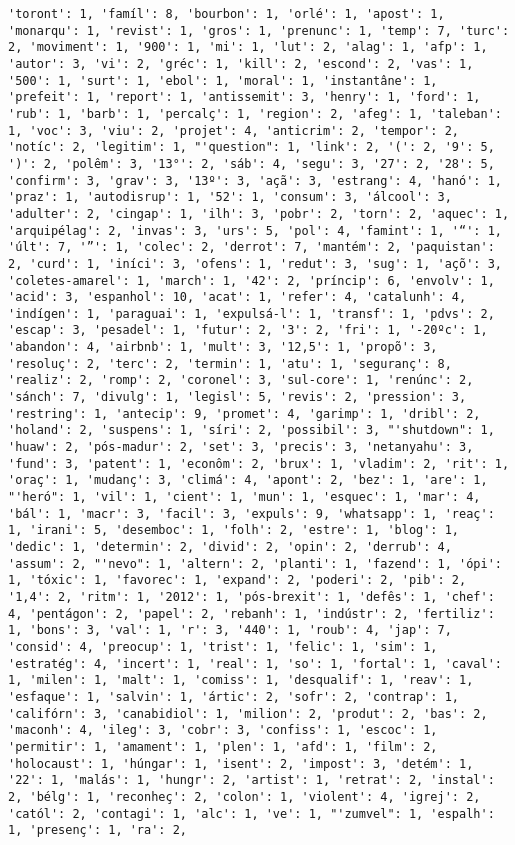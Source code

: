 \documentclass[11pt]{article}
\begin{document}
\begin{Verbatim}[commandchars=\\\{\}]
'toront': 1, 'famíl': 8, 'bourbon': 1, 'orlé': 1, 'apost': 1, 'monarqu': 1, 'revist': 1, 'gros': 1, 'prenunc': 1, 'temp': 7, 'turc': 2, 'moviment': 1, '900': 1, 'mi': 1, 'lut': 2, 'alag': 1, 'afp': 1, 'autor': 3, 'vi': 2, 'gréc': 1, 'kill': 2, 'escond': 2, 'vas': 1, '500': 1, 'surt': 1, 'ebol': 1, 'moral': 1, 'instantâne': 1, 'prefeit': 1, 'report': 1, 'antissemit': 3, 'henry': 1, 'ford': 1, 'rub': 1, 'barb': 1, 'percalç': 1, 'region': 2, 'afeg': 1, 'taleban': 1, 'voc': 3, 'viu': 2, 'projet': 4, 'anticrim': 2, 'tempor': 2, 'notíc': 2, 'legitim': 1, "'question": 1, 'link': 2, '(': 2, '9': 5, ')': 2, 'polêm': 3, '13°': 2, 'sáb': 4, 'segu': 3, '27': 2, '28': 5, 'confirm': 3, 'grav': 3, '13º': 3, 'açã': 3, 'estrang': 4, 'hanó': 1, 'praz': 1, 'autodisrup': 1, '52': 1, 'consum': 3, 'álcool': 3, 'adulter': 2, 'cingap': 1, 'ilh': 3, 'pobr': 2, 'torn': 2, 'aquec': 1, 'arquipélag': 2, 'invas': 3, 'urs': 5, 'pol': 4, 'famint': 1, '“': 1, 'últ': 7, '”': 1, 'colec': 2, 'derrot': 7, 'mantém': 2, 'paquistan': 2, 'curd': 1, 'iníci': 3, 'ofens': 1, 'redut': 3, 'sug': 1, 'açõ': 3, 'coletes-amarel': 1, 'march': 1, '42': 2, 'príncip': 6, 'envolv': 1, 'acid': 3, 'espanhol': 10, 'acat': 1, 'refer': 4, 'catalunh': 4, 'indígen': 1, 'paraguai': 1, 'expulsá-l': 1, 'transf': 1, 'pdvs': 2, 'escap': 3, 'pesadel': 1, 'futur': 2, '3': 2, 'fri': 1, '-20ºc': 1, 'abandon': 4, 'airbnb': 1, 'mult': 3, '12,5': 1, 'propõ': 3, 'resoluç': 2, 'terc': 2, 'termin': 1, 'atu': 1, 'seguranç': 8, 'realiz': 2, 'romp': 2, 'coronel': 3, 'sul-core': 1, 'renúnc': 2, 'sánch': 7, 'divulg': 1, 'legisl': 5, 'revis': 2, 'pression': 3, 'restring': 1, 'antecip': 9, 'promet': 4, 'garimp': 1, 'dribl': 2, 'holand': 2, 'suspens': 1, 'síri': 2, 'possibil': 3, "'shutdown": 1, 'huaw': 2, 'pós-madur': 2, 'set': 3, 'precis': 3, 'netanyahu': 3, 'fund': 3, 'patent': 1, 'econôm': 2, 'brux': 1, 'vladim': 2, 'rit': 1, 'oraç': 1, 'mudanç': 3, 'climá': 4, 'apont': 2, 'bez': 1, 'are': 1, "'heró": 1, 'vil': 1, 'cient': 1, 'mun': 1, 'esquec': 1, 'mar': 4, 'bál': 1, 'macr': 3, 'facil': 3, 'expuls': 9, 'whatsapp': 1, 'reaç': 1, 'irani': 5, 'desemboc': 1, 'folh': 2, 'estre': 1, 'blog': 1, 'dedic': 1, 'determin': 2, 'divid': 2, 'opin': 2, 'derrub': 4, 'assum': 2, "'nevo": 1, 'altern': 2, 'planti': 1, 'fazend': 1, 'ópi': 1, 'tóxic': 1, 'favorec': 1, 'expand': 2, 'poderi': 2, 'pib': 2, '1,4': 2, 'ritm': 1, '2012': 1, 'pós-brexit': 1, 'defês': 1, 'chef': 4, 'pentágon': 2, 'papel': 2, 'rebanh': 1, 'indústr': 2, 'fertiliz': 1, 'bons': 3, 'val': 1, 'r': 3, '440': 1, 'roub': 4, 'jap': 7, 'consid': 4, 'preocup': 1, 'trist': 1, 'felic': 1, 'sim': 1, 'estratég': 4, 'incert': 1, 'real': 1, 'so': 1, 'fortal': 1, 'caval': 1, 'milen': 1, 'malt': 1, 'comiss': 1, 'desqualif': 1, 'reav': 1, 'esfaque': 1, 'salvin': 1, 'ártic': 2, 'sofr': 2, 'contrap': 1, 'califórn': 3, 'canabidiol': 1, 'milion': 2, 'produt': 2, 'bas': 2, 'maconh': 4, 'ileg': 3, 'cobr': 3, 'confiss': 1, 'escoc': 1, 'permitir': 1, 'amament': 1, 'plen': 1, 'afd': 1, 'film': 2, 'holocaust': 1, 'húngar': 1, 'isent': 2, 'impost': 3, 'detém': 1, '22': 1, 'malás': 1, 'hungr': 2, 'artist': 1, 'retrat': 2, 'instal': 2, 'bélg': 1, 'reconheç': 2, 'colon': 1, 'violent': 4, 'igrej': 2, 'catól': 2, 'contagi': 1, 'alc': 1, 've': 1, "'zumvel": 1, 'espalh': 1, 'presenç': 1, 'ra': 2, 
\end{Verbatim}
\end{document}
